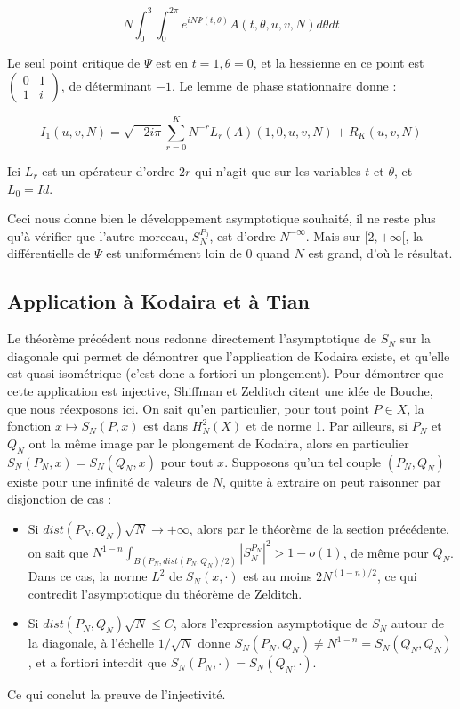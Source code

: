 \begin{preuve}
	\begin{equation*}
		N\int_0^3\int_0^{2\pi}e^{iN\Psi(t,\theta)}A(t,\theta, u,v,N)d\theta  dt
	\end{equation*}
	
	Le seul point critique de $\Psi$ est en $t=1, \theta=0$, et la hessienne en ce point est $\begin{pmatrix}
	0&1\\1&i
	\end{pmatrix}$, de déterminant $-1$. Le lemme de phase stationnaire donne :
	
	\begin{equation*}
	I_1(u,v,N) =\sqrt{-2i\pi}\sum_{r=0}^K N^{-r}L_r(A)(1,0,u,v,N) + R_K(u,v,N)
	\end{equation*}
	
	Ici $L_r$ est un opérateur d'ordre $2r$ qui n'agit que sur les variables $t$ et $\theta$, et $L_0=Id$. 
	
	Ceci nous donne bien le développement asymptotique souhaité, il ne reste plus qu'à vérifier que l'autre morceau, $S_N^{P_0}$, est d'ordre $N^{-\infty}$. Mais sur $[2,+\infty[$, la différentielle de $\Psi$ est uniformément loin de $0$ quand $N$ est grand, d'où le résultat.
	\end{preuve}
	
\subsection{Application à Kodaira et à Tian}
	Le théorème précédent nous redonne directement l'asymptotique de $S_N$ sur la diagonale qui permet de démontrer que l'application de Kodaira existe, et qu'elle est quasi-isométrique (c'est donc a fortiori un plongement). Pour démontrer que cette application est injective, Shiffman et Zelditch citent une idée de Bouche, que nous réexposons ici. On sait qu'en particulier, pour tout point $P \in X$, la fonction $x \mapsto S_N(P,x)$ est dans $H^2_N(X)$ et de norme 1. Par ailleurs, si $P_N$ et $Q_N$ ont la même image par le plongement de Kodaira, alors en particulier $S_N(P_N,x)=S_N(Q_N,x)$ pour tout $x$. Supposons qu'un tel couple $(P_N,Q_N)$ existe pour une infinité de valeurs de $N$, quitte à extraire on peut raisonner par disjonction de cas :
	
	\begin{itemize}
		\item Si $dist(P_N,Q_N)\sqrt{N} \to +\infty$, alors par le théorème de la section précédente, on sait que $N^{1-n}\int_{B(P_N,dist(P_N,Q_N)/2)}|S_N^{P_N}|^2 > 1-o(1)$, de même pour $Q_N$. Dans ce cas, la norme $L^2$ de $S_N(x,\cdot)$ est au moins $2N^{(1-n)/2}$, ce qui contredit l'asymptotique du théorème de Zelditch.
		\item Si $dist(P_N,Q_N)\sqrt{N} \leq C$, alors l'expression asymptotique de $S_N$ autour de la diagonale, à l'échelle $1/\sqrt{N}$ donne $S_N(P_N,Q_N)\neq N^{1-n}=S_N(Q_N,Q_N)$, et a fortiori interdit que $S_N(P_N,\cdot)=S_N(Q_N,\cdot)$.
	\end{itemize}

Ce qui conclut la preuve de l'injectivité.